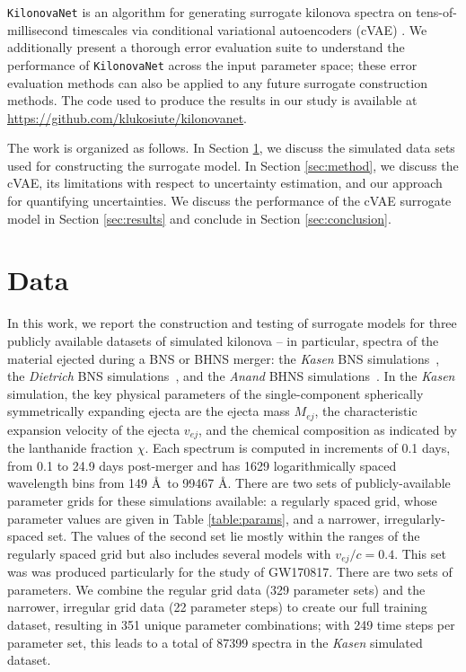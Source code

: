 \documentclass[fleqn,usenatbib,useAMS]{mnras}
\begin{document}
\texttt{KilonovaNet} is an algorithm for generating surrogate kilonova spectra on tens-of-millisecond timescales via conditional variational autoencoders (cVAE) \citep{ kingmaAutoEncodingVariationalBayes2014, rezendeStochasticBackpropagationApproximate2014, sohnLearningStructuredOutput2015}.
We additionally present a thorough error evaluation suite to understand the performance of \texttt{KilonovaNet} across the input parameter space; these error evaluation methods can also be applied to any future surrogate construction methods. The code used to produce the results in our study is available at \url{https://github.com/klukosiute/kilonovanet}.

The work is organized as follows. 
In Section \ref{sec:data}, we discuss the simulated data sets used for constructing the surrogate model.
In Section \ref{sec:method}, we discuss the cVAE, its limitations with respect to uncertainty estimation, and our approach for quantifying uncertainties.   
We discuss the performance of the cVAE surrogate model in Section \ref{sec:results} and conclude in Section \ref{sec:conclusion}.


\section{Data}
\label{sec:data}
In this work, we report the construction and testing of surrogate models for three publicly available datasets of simulated kilonova -- in particular, spectra of the material ejected during a BNS or BHNS merger:
the \emph{Kasen} BNS simulations~\citep{kasenOriginHeavyElements2017}, the \emph{Dietrich} BNS simulations~\citep{dietrichMultimessengerConstraintsNeutronstar2020}, and the \emph{Anand} BHNS simulations~\citep{anandOpticalFollowupNeutron2021}.
In the \emph{Kasen} simulation, the key physical parameters of the single-component spherically symmetrically expanding ejecta are the ejecta mass $M_{ej}$, the characteristic expansion velocity of the ejecta $v_{ej}$, and the chemical composition as indicated by the lanthanide fraction $\chi$. 
Each spectrum is computed in increments of 0.1 days, from 0.1 to 24.9 days post-merger and has 1629 logarithmically spaced wavelength bins from 149 \AA\ to 99467 \AA.
There are two sets of publicly-available parameter grids for these simulations available: a regularly spaced grid, whose parameter values are given in Table \ref{table:params}, and a narrower, irregularly-spaced set. The values of the second set lie mostly within the ranges of the regularly spaced grid but also includes several models with $v_{ej} / c = 0.4$. 
This set was was produced particularly for the study of GW170817. 
There are two sets of parameters. 
We combine the regular grid data (329 parameter sets) and the narrower, irregular grid data (22 parameter steps) to create our full training dataset, resulting in 351 unique parameter combinations; with 249 time steps per parameter set, this leads to a total of 87399 spectra in the \emph{Kasen} simulated dataset.
\end{document}
